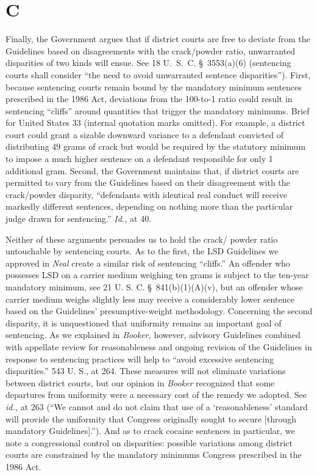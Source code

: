 {{\section{C}

  Finally, the Government argues that if district courts are free
to deviate from the Guidelines based on disagreements \newpage  with
the crack/powder ratio, unwarranted disparities of two kinds will
ensue. See 18 U.~S.~C. \S~3553(a)(6) (sentencing courts shall
consider ``the need to avoid unwarranted sentence disparities'').
First, because sentencing courts remain bound by the mandatory minimum
sentences prescribed in the 1986 Act, deviations from the 100-to-1
ratio could result in sentencing ``cliffs'' around quantities that
trigger the mandatory minimums. Brief for United States 33 (internal
quotation marks omitted). For example, a district court could grant a
sizable downward variance to a defendant convicted of distributing 49
grams of crack but would be required by the statutory minimum to impose
a much higher sentence on a defendant responsible for only 1 additional
gram. Second, the Government maintains that, if district courts are
permitted to vary from the Guidelines based on their disagreement with
the crack/powder disparity, ``defendants with identical real conduct
will receive markedly different sentences, depending on nothing more
than the particular judge drawn for sentencing.'' \emph{Id.,} at 40.

  Neither of these arguments persuades us to hold the crack/ powder
ratio untouchable by sentencing courts. As to the first, the LSD
Guidelines we approved in \emph{Neal} create a similar risk of sentencing
``cliffs.'' An offender who possesses LSD on a carrier medium weighing
ten grams is subject to the ten-year mandatory minimum, see 21 U. S.
C. \S~841(b)(1)(A)(v), but an offender whose carrier medium weighs
slightly less may receive a considerably lower sentence based on the
Guidelines' presumptive-weight methodology. Concerning the second
disparity, it is unquestioned that uniformity remains an important
goal of sentencing. As we explained in \emph{Booker,} however, advisory
Guidelines combined with appellate review for reasonableness and
ongoing revision of the Guidelines in response to sentencing practices
will help to ``avoid excessive sentencing disparities.'' 543 U.
S., at 264. These measures will not eliminate variations between
district courts, but our opinion in \emph{Booker} rec\newpage ognized
that some departures from uniformity were a necessary cost of the
remedy we adopted. See \emph{id.,} at 263 (``We cannot and do not
claim that use of a ‘reasonableness' standard will provide the
uniformity that Congress originally sought to secure [through mandatory
Guidelines].''). And as to crack cocaine sentences in particular, we
note a congressional control on disparities: possible variations among
district courts are constrained by the mandatory minimums Congress
prescribed in the 1986 Act.\footnotemark[15]

}}
